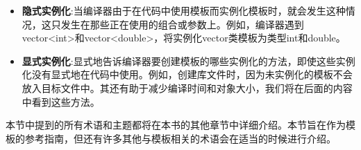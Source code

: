 \begin{itemize}
\item
\textbf{隐式实例化}:当编译器由于在代码中使用模板而实例化模板时，就会发生这种情况，这只发生在那些正在使用的组合或参数上。例如，编译器遇到vector<int>和vector<double>，将实例化vector类模板为类型int和double。

\item
\textbf{显式实例化}:显式地告诉编译器要创建模板的哪些实例化的方法，即使这些实例化没有显式地在代码中使用。例如，创建库文件时，因为未实例化的模板不会放入目标文件中。其还有助于减少编译时间和对象大小，我们将在后面的内容中看到这些方法。
\end{itemize}

本节中提到的所有术语和主题都将在本书的其他章节中详细介绍。本节旨在作为模板的参考指南，但还有许多其他与模板相关的术语会在适当的时候进行介绍。



